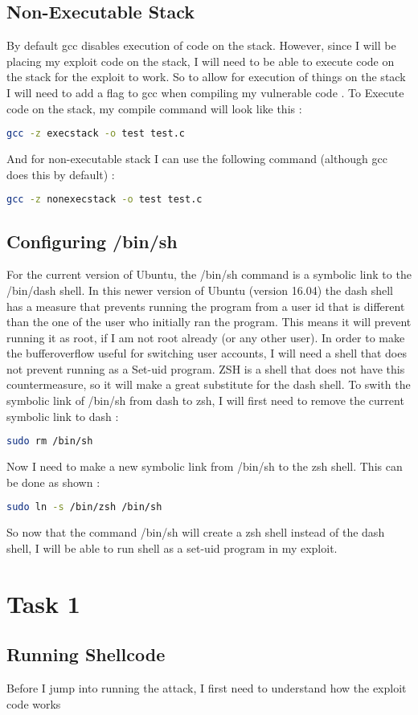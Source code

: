 \documentclass[14pt]{extarticle}
\begin{document}
\subsection{Non-Executable Stack}
By default gcc disables execution of code on the stack. However, since I will be placing my exploit code on the stack, I will need to be able to execute code on the stack for the exploit to work. So to allow for execution of things on the stack I will need to add a flag to gcc when compiling my vulnerable code \cite{seed-bof}.
To Execute code on the stack, my compile command will look like this \cite{seed-bof}:
\begin{lstlisting}[language=bash]
   gcc -z execstack -o test test.c
\end{lstlisting}
And for non-executable stack I can use the following command (although gcc does this by default) \cite{seed-bof}:
\begin{lstlisting}[language=bash]
   gcc -z nonexecstack -o test test.c
\end{lstlisting}

\subsection{Configuring /bin/sh}
For the current version of Ubuntu, the /bin/sh command is a symbolic link to the /bin/dash shell. In this newer version of Ubuntu (version 16.04) the dash shell has a measure that prevents running the program from a user id that is different than the one of the user who initially ran the program. This means it will prevent running it as root, if I am not root already (or any other user). In order to make the bufferoverflow useful for switching user accounts, I will need a shell that does not prevent running as a Set-uid program. ZSH is a shell that does not have this countermeasure, so it will make a great substitute for the dash shell. To swith the symbolic link of /bin/sh from dash to zsh, I will first need to remove the current symbolic link to dash \cite{seed-bof}:
\begin{lstlisting}[language=bash]
  sudo rm /bin/sh
\end{lstlisting}
Now I need to make a new symbolic link from /bin/sh to the zsh shell. This can be done as shown \cite{seed-bof}:
\begin{lstlisting}[language=bash]
  sudo ln -s /bin/zsh /bin/sh
\end{lstlisting}
So now that the command /bin/sh will create a zsh shell instead of the dash shell, I will be able to run shell as a set-uid program in my exploit.

\section{Task 1}
\subsection{Running Shellcode}
  Before I jump into running the attack, I first need to understand how the exploit code works

\newpage



\newpage


\end{document}
